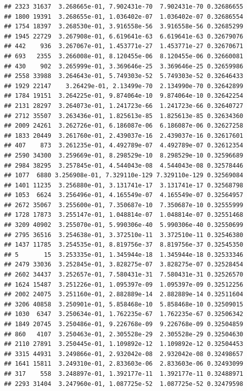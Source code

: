 \documentclass[
]{article}
\begin{document}
\begin{verbatim}
## 2323 31637  3.268665e-01, 7.902431e-70  7.902431e-70 0.32686655
## 1800 19391  3.268655e-01, 1.036402e-07  1.036402e-07 0.32686554
## 1754 18397  3.268530e-01, 3.916558e-56  3.916558e-56 0.32685299
## 1945 22729  3.267908e-01, 6.619641e-63  6.619641e-63 0.32679076
## 442    936  3.267067e-01, 1.453771e-27  1.453771e-27 0.32670671
## 693   2355  3.266008e-01, 8.120455e-06  8.120455e-06 0.32660081
## 430    902  3.265999e-01, 3.369646e-25  3.369646e-25 0.32659986
## 2558 33988  3.264643e-01, 5.749303e-52  5.749303e-52 0.32646433
## 1929 22147    3.26429e-01, 2.13499e-70  2.134990e-70 0.32642899
## 1784 19151  3.264225e-01, 9.874064e-10  9.874064e-10 0.32642254
## 2131 28297  3.264073e-01, 1.241723e-66  1.241723e-66 0.32640727
## 2712 35507  3.263436e-01, 1.825613e-85  1.825613e-85 0.32634360
## 2009 24261  3.262726e-01, 6.186087e-06  6.186087e-06 0.32627258
## 1833 20449  3.261760e-01, 2.439037e-16  2.439037e-16 0.32617601
## 407    873  3.261235e-01, 4.492789e-07  4.492789e-07 0.32612354
## 2590 34300  3.259669e-01, 8.298529e-10  8.298529e-10 0.32596689
## 2984 38295  3.257845e-01, 4.544043e-08  4.544043e-08 0.32578446
## 1077  6880 3.256908e-01, 7.329110e-129 7.329110e-129 0.32569084
## 1401 11235  3.256880e-01, 3.131741e-17  3.131741e-17 0.32568798
## 1053  6624  3.256496e-01, 4.165549e-07  4.165549e-07 0.32564957
## 2672 35067  3.255600e-01, 7.350687e-10  7.350687e-10 0.32555999
## 1728 17873  3.255147e-01, 1.048814e-07  1.048814e-07 0.32551468
## 3209 40902  3.255070e-01, 5.990306e-40  5.990306e-40 0.32550699
## 2795 36516  3.254638e-01, 3.372510e-11  3.372510e-11 0.32546380
## 1437 11785  3.254535e-01, 8.819756e-37  8.819756e-37 0.32545350
## 5       15  3.253335e-01, 1.345944e-18  1.345944e-18 0.32533346
## 2479 33036  3.252845e-01, 3.828275e-07  3.828275e-07 0.32528454
## 2602 34437  3.252657e-01, 7.580431e-31  7.580431e-31 0.32526570
## 1624 15487  3.251226e-01, 1.095397e-09  1.095397e-09 0.32512256
## 2002 24075  3.251160e-01, 2.882889e-14  2.882889e-14 0.32511604
## 3206 40858  3.250901e-01, 5.858468e-10  5.858468e-10 0.32509015
## 1030  6347  3.250634e-01, 1.762235e-67  1.762235e-67 0.32506342
## 1849 20745  3.250486e-01, 9.226768e-09  9.226768e-09 0.32504859
## 860   4107  3.250463e-01, 2.305528e-29  2.305528e-29 0.32504630
## 2110 27891  3.250445e-01, 1.109892e-12  1.109892e-12 0.32504453
## 3315 44931  3.249866e-01, 2.932042e-08  2.932042e-08 0.32498657
## 1641 15811  3.249310e-01, 2.833603e-06  2.833603e-06 0.32493099
## 317    558  3.248897e-01, 1.392177e-11  1.392177e-11 0.32488971
## 2293 31404  3.247960e-01, 1.087725e-52  1.087725e-52 0.32479598

\end{verbatim}
\end{document}
